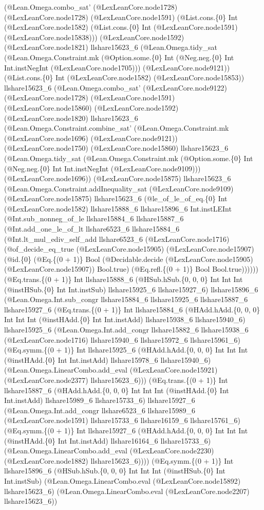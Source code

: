 \documentclass[11pt]{article}
\begin{document}
(@Lean.Omega.combo\_sat' (@LexLeanCore.node1728) (@LexLeanCore.node1728) (@LexLeanCore.node1591) (@List.cons.\{0\} Int (@LexLeanCore.node1582) (@List.cons.\{0\} Int (@LexLeanCore.node1591) (@LexLeanCore.node15838))) (@LexLeanCore.node1592) (@LexLeanCore.node1821) llshare15623\_6 (@Lean.Omega.tidy\_sat (@Lean.Omega.Constraint.mk (@Option.some.\{0\} Int (@Neg.neg.\{0\} Int Int.instNegInt (@LexLeanCore.node1705))) (@LexLeanCore.node9121)) (@List.cons.\{0\} Int (@LexLeanCore.node1582) (@LexLeanCore.node15853)) llshare15623\_6 (@Lean.Omega.combo\_sat' (@LexLeanCore.node9122) (@LexLeanCore.node1728) (@LexLeanCore.node1591) (@LexLeanCore.node15860) (@LexLeanCore.node1592) (@LexLeanCore.node1820) llshare15623\_6 (@Lean.Omega.Constraint.combine\_sat' (@Lean.Omega.Constraint.mk (@LexLeanCore.node1696) (@LexLeanCore.node9121)) (@LexLeanCore.node1750) (@LexLeanCore.node15860) llshare15623\_6 (@Lean.Omega.tidy\_sat (@Lean.Omega.Constraint.mk (@Option.some.\{0\} Int (@Neg.neg.\{0\} Int Int.instNegInt (@LexLeanCore.node9109))) (@LexLeanCore.node1696)) (@LexLeanCore.node15875) llshare15623\_6 (@Lean.Omega.Constraint.addInequality\_sat (@LexLeanCore.node9109) (@LexLeanCore.node15875) llshare15623\_6 (@le\_of\_le\_of\_eq.\{0\} Int (@LexLeanCore.node1582) llshare15888\_6 llshare15896\_6 Int.instLEInt (@Int.sub\_nonneg\_of\_le llshare15884\_6 llshare15887\_6 (@Int.add\_one\_le\_of\_lt llshare6523\_6 llshare15884\_6 (@Int.lt\_mul\_ediv\_self\_add llshare6523\_6 (@LexLeanCore.node1716) (@of\_decide\_eq\_true (@LexLeanCore.node15905) (@LexLeanCore.node15907) (@id.\{0\} (@Eq.\{(0 + 1)\} Bool (@Decidable.decide (@LexLeanCore.node15905) (@LexLeanCore.node15907)) Bool.true) (@Eq.refl.\{(0 + 1)\} Bool Bool.true)))))) (@Eq.trans.\{(0 + 1)\} Int llshare15888\_6 (@HSub.hSub.\{0, 0, 0\} Int Int Int (@instHSub.\{0\} Int Int.instSub) llshare15925\_6 llshare15927\_6) llshare15896\_6 (@Lean.Omega.Int.sub\_congr llshare15884\_6 llshare15925\_6 llshare15887\_6 llshare15927\_6 (@Eq.trans.\{(0 + 1)\} Int llshare15884\_6 (@HAdd.hAdd.\{0, 0, 0\} Int Int Int (@instHAdd.\{0\} Int Int.instAdd) llshare15938\_6 llshare15940\_6) llshare15925\_6 (@Lean.Omega.Int.add\_congr llshare15882\_6 llshare15938\_6 (@LexLeanCore.node1716) llshare15940\_6 llshare15972\_6 llshare15961\_6) (@Eq.symm.\{(0 + 1)\} Int llshare15925\_6 (@HAdd.hAdd.\{0, 0, 0\} Int Int Int (@instHAdd.\{0\} Int Int.instAdd) llshare15978\_6 llshare15940\_6) (@Lean.Omega.LinearCombo.add\_eval (@LexLeanCore.node15921) (@LexLeanCore.node2377) llshare15623\_6))) (@Eq.trans.\{(0 + 1)\} Int llshare15887\_6 (@HAdd.hAdd.\{0, 0, 0\} Int Int Int (@instHAdd.\{0\} Int Int.instAdd) llshare15989\_6 llshare15733\_6) llshare15927\_6 (@Lean.Omega.Int.add\_congr llshare6523\_6 llshare15989\_6 (@LexLeanCore.node1591) llshare15733\_6 llshare16159\_6 llshare15761\_6) (@Eq.symm.\{(0 + 1)\} Int llshare15927\_6 (@HAdd.hAdd.\{0, 0, 0\} Int Int Int (@instHAdd.\{0\} Int Int.instAdd) llshare16164\_6 llshare15733\_6) (@Lean.Omega.LinearCombo.add\_eval (@LexLeanCore.node2230) (@LexLeanCore.node1882) llshare15623\_6)))) (@Eq.symm.\{(0 + 1)\} Int llshare15896\_6 (@HSub.hSub.\{0, 0, 0\} Int Int Int (@instHSub.\{0\} Int Int.instSub) (@Lean.Omega.LinearCombo.eval (@LexLeanCore.node15892) llshare15623\_6) (@Lean.Omega.LinearCombo.eval (@LexLeanCore.node2207) llshare15623\_6)) 
\end{document}
